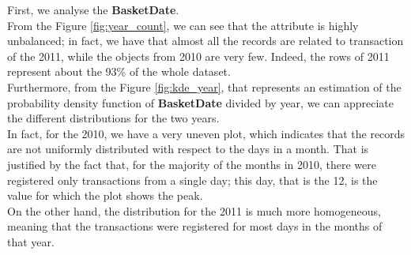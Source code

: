 First, we analyse the \textbf{BasketDate}.\\
From the Figure \ref{fig:year_count}, we can see that the attribute is highly unbalanced; in fact, we have that almost all the records are related to transaction of the 2011, while the objects from 2010 are very few.
Indeed, the rows of 2011 represent about the 93\% of the whole dataset.\\
Furthermore, from the Figure \ref{fig:kde_year}, that represents an estimation of the probability density function of \textbf{BasketDate} divided by year, we can appreciate the different distributions for the two years.\\
In fact, for the 2010, we have a very uneven plot, which indicates that the records are not uniformly distributed with respect to the days in a month. That is justified by the fact that, for the majority of the months in 2010, there were registered only transactions from a single day; this day, that is the 12, is the value for which the plot shows the peak.\\
On the other hand, the distribution for the 2011 is much more homogeneous, meaning that the transactions were registered for most days in the months of that year.
